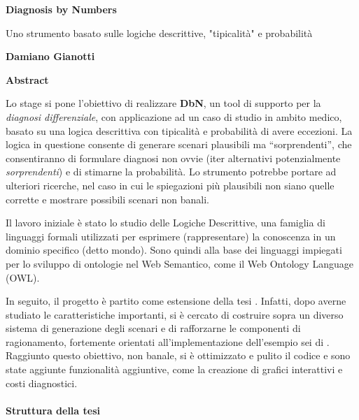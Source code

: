

\thispagestyle{plain}
\begin{center}
	\Large
	\textbf{Diagnosis by Numbers}
	
	\vspace{0.4cm}
	\large
	Uno strumento basato sulle logiche descrittive, "tipicalità" e probabilità
	
	\vspace{0.4cm}
	\textbf{Damiano Gianotti}
	
	\vspace{0.9cm}
	\textbf{Abstract}
\end{center}

Lo stage si pone l’obiettivo di realizzare \textbf{DbN}, un tool di supporto per la \textit{diagnosi differenziale}, 
con applicazione ad un caso di studio in ambito medico, basato su una logica descrittiva con tipicalità e probabilità di avere eccezioni.
La logica in questione consente di generare scenari plausibili ma “sorprendenti”, che consentiranno di formulare
diagnosi non ovvie  (iter alternativi potenzialmente \textit{sorprendenti}) e di stimarne la probabilità. 
Lo strumento potrebbe portare ad ulteriori ricerche, nel caso in cui le spiegazioni
più plausibili non siano quelle corrette e mostrare possibili scenari non banali.
 
Il lavoro iniziale è stato lo studio delle Logiche Descrittive, una famiglia 
di linguaggi formali utilizzati per esprimere (rappresentare) la conoscenza 
in un dominio specifico (detto mondo). Sono quindi alla base dei linguaggi impiegati per lo sviluppo
di ontologie nel Web Semantico, come il Web Ontology Language (OWL).

In seguito, il progetto è partito come estensione della tesi  \cite{PEAR}. Infatti, dopo averne studiato le caratteristiche importanti, si è cercato di costruire sopra
un diverso sistema di generazione degli scenari e di rafforzarne le componenti di ragionamento, fortemente orientati all'implementazione dell'esempio sei di  \cite{ProbOfEx}.
Raggiunto questo obiettivo, non banale, si è ottimizzato e pulito il codice
e sono state aggiunte funzionalità aggiuntive, come la creazione di grafici interattivi e costi
diagnostici.

\paragraph{Struttura della tesi} \hfill

